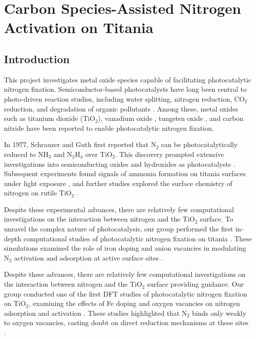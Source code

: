 
\chapter{Carbon Species-Assisted Nitrogen Activation on Titania}
\section{Introduction}
This project investigates metal oxide species capable of facilitating photocatalytic nitrogen fixation. Semiconductor-based photocatalysts have long been central to photo-driven reaction studies, including water splitting, nitrogen reduction, CO$_2$ reduction, and degradation of organic pollutants \cite{INOUE1979PhotoelectrocatalyticPowders, Mao2009PromotingOrange}. Among these, metal oxides such as titanium dioxide (TiO$_2$), vanadium oxide \cite{Tennakone1993NitrogenIII}, tungsten oxide \cite{Endoh_1986, li_2016}, and carbon nitride \cite{Dong_2015, MA_2016} have been reported to enable photocatalytic nitrogen fixation. 

In 1977, Schrauzer and Guth first reported that N$_2$ can be photocatalytically reduced to NH$_3$ and N$_2$H$_4$ over TiO$_2$\cite{Schrauzer_1977}. This discovery prompted extensive investigations into semiconducting oxides and hydroxides as photocatalysts \cite{bourgeois_1988, palmisano_1988, Schrauzer_2011, Hirakawa_2017, skuldsson_2017, tennakone_1988, li_2016}. Subsequent experiments found signals of ammonia formation on titania surfaces under light exposure \cite{Bickley_1979, Augugliaro_1982, Soria_1991, Yuan_2013, Hirakawa_2017}, and further studies explored the surface chemistry of nitrogen on rutile TiO$_2$ \cite{Yates_1991, Kim2016, Kim2014, Chen_2007, Karunagaran_2007}.

Despite these experimental advances, there are relatively few computational investigations on the interaction between nitrogen and the TiO$_2$ surface. To unravel the complex nature of photocatalysis, our group performed the first in-depth computational studies of photocatalytic nitrogen fixation on titania \cite{Comer_sustainable, comer2018role}. These simulations examined the role of iron doping and anion vacancies in modulating N$_2$ activation and adsorption at active surface sites \cite{comer2018role, mao_2019, Schrauzer_1977, Hirakawa_2017, Comer_sustainable}.

Despite these advances, there are relatively few computational investigations on the interaction between nitrogen and the TiO$_2$ surface providing guidance. Our group conducted one of the first DFT studies of photocatalytic nitrogen fixation on TiO$_2$, examining the effects of Fe doping and oxygen vacancies on nitrogen adsorption and activation \cite{Comer_sustainable, comer2018role, mao_2019}. These studies highlighted that N$_2$ binds only weakly to oxygen vacancies, casting doubt on direct reduction mechanisms at these sites \cite{Huang2023FormationIllumination}.

